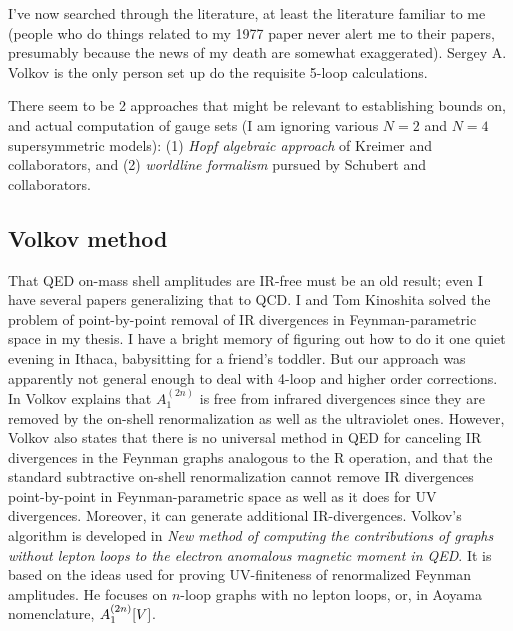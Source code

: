 
I've now searched through the literature, at least the literature
familiar to me (people who do things related to my 1977
paper never alert me to their papers, presumably
because the news of my death are somewhat exaggerated).
Sergey  A. Volkov is the only person set up do the requisite 5-loop
calculations.

There seem to be 2 approaches that might be relevant to
establishing bounds on, and actual computation
of gauge sets (I am ignoring various $N=2$ and $N=4$
supersymmetric models):
(1) \emph{Hopf algebraic approach} of Kreimer and collaborators,
and
(2)
\emph{worldline formalism} pursued by Schubert and collaborators.

\subsection{Volkov method}
\label{sect:Volkov}

That QED on-mass shell amplitudes are IR-free must be an old result; even
I have several papers generalizing that to
QCD. I and Tom Kinoshita solved
the problem of point-by-point removal of IR divergences in
Feynman-parametric space in my thesis. I have a bright
memory of figuring out how to do it one quiet evening in Ithaca,
babysitting for a friend's toddler. But
our approach was apparently not general enough to deal with 4-loop and
higher order corrections.
In  Volkov explains that $A_1^{(2n)}$ is free from
infrared divergences since they are removed by the on-shell
renormalization as well as the ultraviolet ones.
However, Volkov also states that there is no universal
method in QED for canceling IR divergences in the
Feynman graphs analogous to the R operation, and
that the standard subtractive on-shell renormalization cannot remove
IR divergences point-by-point in Feynman-parametric space as well as it
does for UV divergences. Moreover, it can generate additional
IR-divergences.
Volkov's algorithm is developed in {\em New method of computing the
contributions of graphs without lepton loops to the electron anomalous
magnetic moment in {QED}}. It is based on the ideas used for
proving UV-finiteness of renormalized Feynman
amplitudes.
He focuses on $n$-loop graphs with no lepton loops, or, in Aoyama
\etal{} nomenclature,
$A_1^{(2n)}[V]$.

